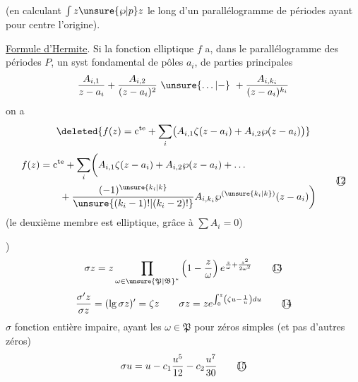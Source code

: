 (en calculant $\int z\unsure{\wp|p}z$ le long d'un parallélogramme de périodes ayant pour centre l'origine).

\uline{Formule d'Hermite}. Si la fonction elliptique $f$ a, dans le parallélogramme des périodes $P$, un syst fondamental de pôles $a_i$, de parties principales
\[
\frac{A_{i,1}}{z-a_i}+\frac{A_{i,2}}{(z-a_i)^2}\ \unsure{\ldots|{-}}\ +\frac{A_{i,k_i}}{(z-a_i)^{k_i}}
\]
on a
\[
\deleted{f(z)=\mathrm c^{\mathrm{te}}+\sum_i\bigl(A_{i,1}\zeta(z-a_i)+A_{i,2}\wp(z-a_i)\bigr)}
\]
\[
\begin{aligned}
f(z)&=\mathrm c^{\mathrm{te}}+\sum_i\biggl(A_{i,1}\zeta(z-a_i)+A_{i,2}\wp(z-a_i)+\ldots\\
&\qquad+\frac{(-1)^{\unsure{k_i|k}}}{\unsure{(k_i-1)!|(k_i-2)!}}A_{i,k_i}\wp^{(\unsure{k_i|k})}(z-a_i)\biggr)
\end{aligned}\tag*{\textcircled{12}}
\]
(le deuxième membre est elliptique, grâce à $\sum A_i=0$)

) 
\[
\sigma z=z\prod_{\omega\in{\unsure{\mathfrak P|\mathfrak B}}^{*}}\left(1-\frac z\omega\right)e^{\frac z\omega+\frac{z^2}{2\omega^2}}\tag*{\textcircled{13}}
\]
\[
\frac{\sigma'z}{\sigma z}=(\lg\sigma z)'=\zeta z\qquad \sigma z=ze^{\int_0^z\left(\zeta u-\frac1u\right)du}\tag*{\textcircled{14}}
\]
$\sigma$ fonction entière impaire, ayant les $\omega\in\mathfrak P$ pour  zéros simples (et pas d'autres zéros)
\[
\sigma u=u-c_1\frac{u^5}{12}-c_2\frac{u^7}{30}\tag*{\textcircled{15}}
\]

